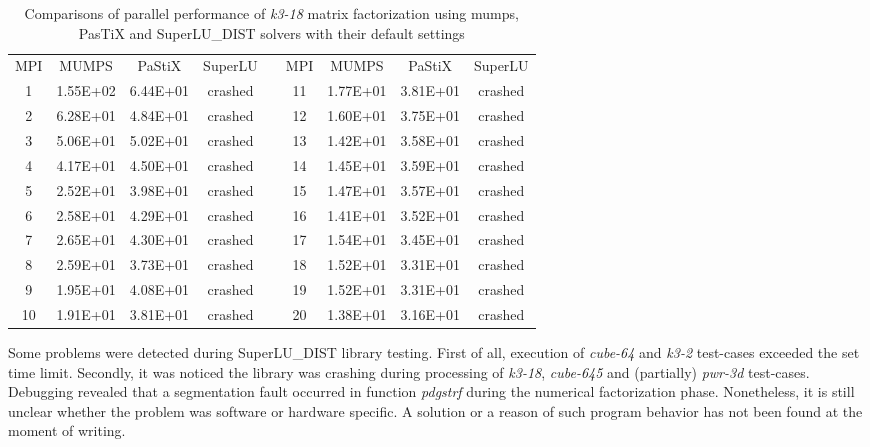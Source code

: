 \begin{table}[h!]
\centering
\begin{tabular}{|c|c|c|c|l|c|c|c|c|}
\cline{1-4} \cline{6-9}
MPI & MUMPS    & PaStiX   & SuperLU &  & MPI & MUMPS    & PaStiX   & SuperLU \\ \cline{1-4} \cline{6-9} 
1   & 1.55E+02 & 6.44E+01 & crashed &  & 11  & 1.77E+01 & 3.81E+01 & crashed \\ \cline{1-4} \cline{6-9} 
2   & 6.28E+01 & 4.84E+01 & crashed &  & 12  & 1.60E+01 & 3.75E+01 & crashed \\ \cline{1-4} \cline{6-9} 
3   & 5.06E+01 & 5.02E+01 & crashed &  & 13  & 1.42E+01 & 3.58E+01 & crashed \\ \cline{1-4} \cline{6-9} 
4   & 4.17E+01 & 4.50E+01 & crashed &  & 14  & 1.45E+01 & 3.59E+01 & crashed \\ \cline{1-4} \cline{6-9} 
5   & 2.52E+01 & 3.98E+01 & crashed &  & 15  & 1.47E+01 & 3.57E+01 & crashed \\ \cline{1-4} \cline{6-9} 
6   & 2.58E+01 & 4.29E+01 & crashed &  & 16  & 1.41E+01 & 3.52E+01 & crashed \\ \cline{1-4} \cline{6-9} 
7   & 2.65E+01 & 4.30E+01 & crashed &  & 17  & 1.54E+01 & 3.45E+01 & crashed \\ \cline{1-4} \cline{6-9} 
8   & 2.59E+01 & 3.73E+01 & crashed &  & 18  & 1.52E+01 & 3.31E+01 & crashed \\ \cline{1-4} \cline{6-9} 
9   & 1.95E+01 & 4.08E+01 & crashed &  & 19  & 1.52E+01 & 3.31E+01 & crashed \\ \cline{1-4} \cline{6-9} 
10  & 1.91E+01 & 3.81E+01 & crashed &  & 20  & 1.38E+01 & 3.16E+01 & crashed \\ \cline{1-4} \cline{6-9} 
\end{tabular}
\caption{Comparisons of parallel performance of \textit{k3-18} matrix factorization using \gls{mumps}, PasTiX and SuperLU\_DIST solvers with their default settings}
\label{table:lc-k3-18-result}
\end{table}



Some problems were detected during  SuperLU\_DIST library testing. First of all, execution of \textit{cube-64} and \textit{k3-2} test-cases exceeded the set time limit. Secondly, it was noticed the library was crashing during processing of \textit{k3-18}, \textit{cube-645} and (partially) \textit{pwr-3d} test-cases. Debugging revealed that a segmentation fault occurred in function \textit{pdgstrf}  during the numerical factorization phase. Nonetheless, it is still unclear whether the problem was software or hardware specific. A solution or a reason of such program behavior has not been found at the moment of writing.\\


